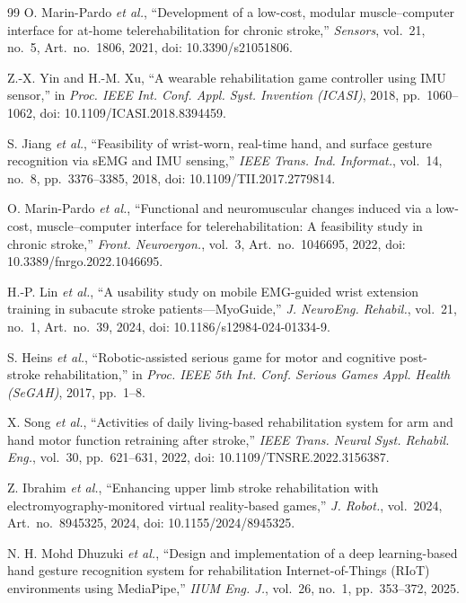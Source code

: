 \documentclass[10pt,a4paper,twocolumn]{article}
\begin{document}
\begin{thebibliography}{99}
 O. Marin-Pardo \textit{et al.}, ``Development of a low-cost, modular muscle--computer interface for at-home telerehabilitation for chronic stroke,'' \textit{Sensors}, vol.~21, no.~5, Art.~no.~1806, 2021, doi: 10.3390/s21051806.

 Z.-X. Yin and H.-M. Xu, ``A wearable rehabilitation game controller using IMU sensor,'' in \textit{Proc. IEEE Int. Conf. Appl. Syst. Invention (ICASI)}, 2018, pp.~1060--1062, doi: 10.1109/ICASI.2018.8394459.

 S. Jiang \textit{et al.}, ``Feasibility of wrist-worn, real-time hand, and surface gesture recognition via sEMG and IMU sensing,'' \textit{IEEE Trans. Ind. Informat.}, vol.~14, no.~8, pp.~3376--3385, 2018, doi: 10.1109/TII.2017.2779814.

 O. Marin-Pardo \textit{et al.}, ``Functional and neuromuscular changes induced via a low-cost, muscle--computer interface for telerehabilitation: A feasibility study in chronic stroke,'' \textit{Front. Neuroergon.}, vol.~3, Art.~no.~1046695, 2022, doi: 10.3389/fnrgo.2022.1046695.

 H.-P. Lin \textit{et al.}, ``A usability study on mobile EMG-guided wrist extension training in subacute stroke patients---MyoGuide,'' \textit{J. NeuroEng. Rehabil.}, vol.~21, no.~1, Art.~no.~39, 2024, doi: 10.1186/s12984-024-01334-9.

 S. Heins \textit{et al.}, ``Robotic-assisted serious game for motor and cognitive post-stroke rehabilitation,'' in \textit{Proc. IEEE 5th Int. Conf. Serious Games Appl. Health (SeGAH)}, 2017, pp.~1--8.

 X. Song \textit{et al.}, ``Activities of daily living-based rehabilitation system for arm and hand motor function retraining after stroke,'' \textit{IEEE Trans. Neural Syst. Rehabil. Eng.}, vol.~30, pp.~621--631, 2022, doi: 10.1109/TNSRE.2022.3156387.

 Z. Ibrahim \textit{et al.}, ``Enhancing upper limb stroke rehabilitation with electromyography-monitored virtual reality-based games,'' \textit{J. Robot.}, vol.~2024, Art.~no.~8945325, 2024, doi: 10.1155/2024/8945325.

 N. H. Mohd Dhuzuki \textit{et al.}, ``Design and implementation of a deep learning-based hand gesture recognition system for rehabilitation Internet-of-Things (RIoT) environments using MediaPipe,'' \textit{IIUM Eng. J.}, vol.~26, no.~1, pp.~353--372, 2025.


\end{thebibliography}
\end{document}
